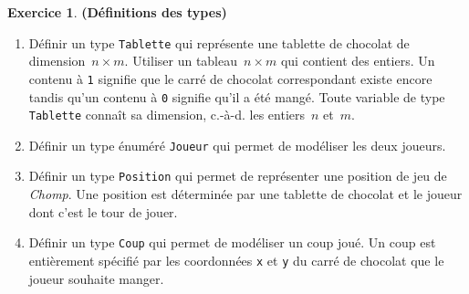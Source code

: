\documentclass[12pt]{article}
\theoremstyle{definition}
\newtheorem{Exercice}{Exercice}
\begin{document}
\begin{Exercice} {\bf (Définitions des types)}\smallskip
\label{ex:1}

    \begin{enumerate}
        \item Définir un type {\tt Tablette} qui représente une tablette de
        chocolat de dimension~$n \times m$. Utiliser un tableau~$n \times m$
        qui contient des entiers. Un contenu à {\tt 1} signifie
        que le carré de chocolat correspondant existe encore tandis qu'un contenu
        à {\tt 0} signifie qu'il a été mangé. Toute variable de type
        {\tt Tablette} connaît sa dimension, c.-à-d. les entiers~$n$
        et~$m$.
        \smallskip

        \item Définir un type énuméré {\tt Joueur} qui permet de modéliser
        les deux joueurs.
        \smallskip

        \item Définir un type {\tt Position} qui permet de représenter une
        position de jeu de {\em Chomp}. Une position est déterminée par une tablette
        de chocolat et le joueur dont c'est le tour de jouer.
        \smallskip

        \item Définir un type {\tt Coup} qui permet de modéliser un coup joué.
        Un coup est entièrement spécifié par les coordonnées {\tt x} et {\tt y}
        du carré de chocolat que le joueur souhaite manger.
    \end{enumerate}
\end{Exercice}
\bigskip
\end{document}
